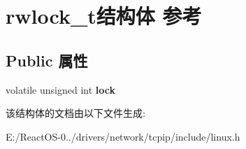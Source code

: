\hypertarget{structrwlock__t}{}\section{rwlock\+\_\+t结构体 参考}
\label{structrwlock__t}
\subsection*{Public 属性}
\begin{DoxyCompactItemize}
\item 
\mbox{\label{structrwlock__t_af45a2ff6a527b91bc21ec3c37ab1d999}} 
volatile unsigned int {\bfseries lock}
\end{DoxyCompactItemize}


该结构体的文档由以下文件生成\+:\begin{DoxyCompactItemize}
\item 
E\+:/\+React\+O\+S-\/0../drivers/network/tcpip/include/linux.\+h\end{DoxyCompactItemize}
